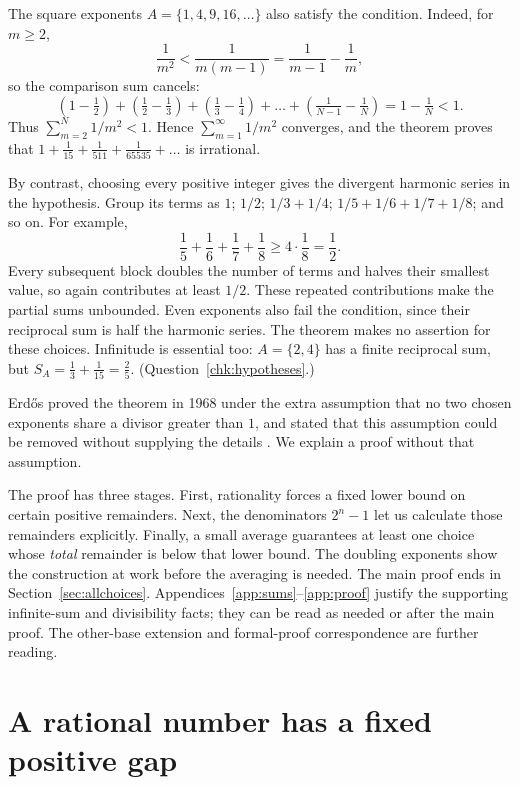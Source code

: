 \documentclass[10pt]{article}
\theoremstyle{plain}
\theoremstyle{definition}
\theoremstyle{remark}
\begin{document}
\begin{samepage}
The square exponents $A=\{1,4,9,16,\dots\}$ also satisfy the condition.
Indeed, for $m\ge2$,
\[
 \frac1{m^2}<\frac1{m(m-1)}=\frac1{m-1}-\frac1m,
\]
so the comparison sum cancels:
\[
 (1-\tfrac12)+(\tfrac12-\tfrac13)+(\tfrac13-\tfrac14)
 +\dots+(\tfrac1{N-1}-\tfrac1N)=1-\tfrac1N<1.
\]
Thus $\sum_{m=2}^{N}1/m^2<1$. Hence
$\sum_{m=1}^{\infty}1/m^2$ converges, and the theorem proves that
$1+\tfrac1{15}+\tfrac1{511}+\tfrac1{65535}+\dots$ is irrational.\par
\end{samepage}

By contrast, choosing every positive integer gives the divergent harmonic
series in the hypothesis. Group its terms as $1$; $1/2$; $1/3+1/4$;
$1/5+1/6+1/7+1/8$; and so on. For example,
\[
 \frac15+\frac16+\frac17+\frac18\ge4\cdot\frac18=\frac12.
\]
Every subsequent block doubles the number of terms and halves their smallest
value, so again contributes at least $1/2$. These repeated contributions
make the partial sums unbounded. Even exponents also fail the condition, since their reciprocal sum
is half the harmonic series. The theorem makes no assertion for these
choices. Infinitude is essential too: $A=\{2,4\}$ has a finite reciprocal
sum, but $S_A=\tfrac13+\tfrac1{15}=\tfrac25$.
(Question~\ref{chk:hypotheses}.)

Erd\H{o}s proved the theorem in 1968 under the extra assumption that no two
chosen exponents share a divisor greater than $1$, and stated that this
assumption could be removed without supplying the details \cite[p.~222]{erdos1968}.
We explain a proof without that assumption.

The proof has three stages. First, rationality forces a fixed lower bound
on certain positive remainders. Next, the denominators $2^n-1$ let us
calculate those remainders explicitly. Finally, a small average guarantees
at least one choice whose \emph{total} remainder is below that lower bound. The doubling exponents show the
construction at work before the averaging is needed.
The main proof ends in Section~\ref{sec:allchoices}.
Appendices~\ref{app:sums}--\ref{app:proof} justify the supporting infinite-sum
and divisibility facts; they can be read as needed or after the main proof.
The other-base extension and formal-proof correspondence are further reading.

\section{A rational number has a fixed positive gap}\label{sec:test}
\end{document}
